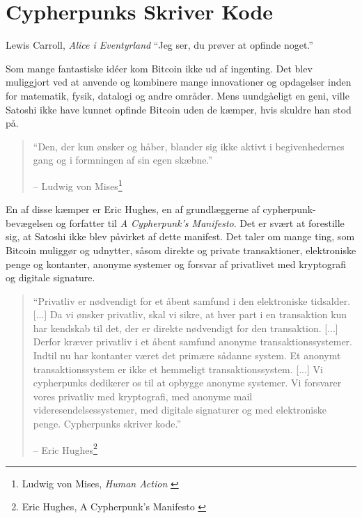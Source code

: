 \chapter{Cypherpunks Skriver Kode}
\label{les:20}

\begin{chapquote}{Lewis Carroll, \textit{Alice i Eventyrland}}
\enquote{Jeg ser, du prøver at opfinde noget.}
\end{chapquote}

Som mange fantastiske idéer kom Bitcoin ikke ud af ingenting. Det blev
muliggjort ved at anvende og kombinere mange innovationer og opdagelser inden
for matematik, fysik, datalogi og andre områder. Mens
uundgåeligt en geni, ville Satoshi ikke have kunnet opfinde Bitcoin
uden de kæmper, hvis skuldre han stod på.

\begin{quotation}\begin{samepage}
\enquote{Den, der kun ønsker og håber, blander sig ikke aktivt i 
begivenhedernes gang og i formningen af sin egen skæbne.}
\begin{flushright} -- Ludwig von Mises\footnote{Ludwig von Mises, 
  \textit{Human Action} \cite{human-action}}
\end{flushright}\end{samepage}\end{quotation}

En af disse kæmper er Eric Hughes, en af grundlæggerne af 
cypherpunk-bevægelsen og forfatter til \textit{A Cypherpunk's Manifesto}. 
Det er svært at forestille sig, at Satoshi ikke blev påvirket af dette 
manifest. Det taler om mange ting, som Bitcoin muliggør og udnytter, 
såsom direkte og private transaktioner, elektroniske penge og kontanter, 
anonyme systemer og forsvar af privatlivet med kryptografi og digitale 
signature.

\begin{quotation}\begin{samepage}
\enquote{Privatliv er nødvendigt for et åbent samfund i den elektroniske 
tidsalder. [...] Da vi ønsker privatliv, skal vi sikre, at hver part i en
transaktion kun har kendskab til det, der er direkte nødvendigt for den
transaktion. [...] Derfor kræver privatliv i et åbent samfund anonyme 
transaktionssystemer. Indtil nu har kontanter været det primære sådanne 
system. Et anonymt transaktionssystem er ikke et hemmeligt transaktionssystem.
[...]
Vi cypherpunks dedikerer os til at opbygge anonyme systemer. Vi forsvarer 
vores privatliv med kryptografi, med anonyme mail
videresendelsessystemer, med digitale signaturer og med elektroniske
penge.
Cypherpunks skriver kode.}
\begin{flushright} -- Eric Hughes\footnote{Eric Hughes, A Cypherpunk's 
  Manifesto \cite{cypherpunk-manifesto}}
\end{flushright}\end{samepage}\end{quotation}

